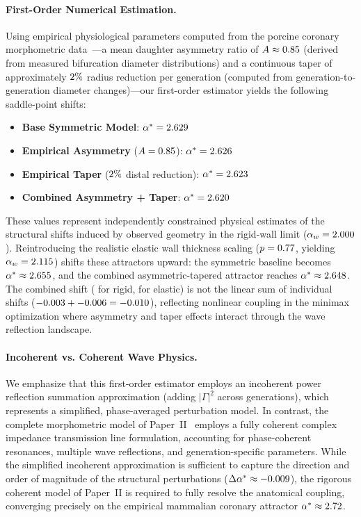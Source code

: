 \documentclass[11pt,a4paper]{article}
\theoremstyle{remark}
\begin{document}
\paragraph{First-Order Numerical Estimation.}
Using empirical physiological parameters computed from the porcine coronary
morphometric data~\cite{kassab1993,kaimovitz2008}---a mean daughter asymmetry
ratio of $A \approx 0.85$ (derived from measured bifurcation
diameter distributions) and a continuous taper of approximately
$2\%$ radius reduction per generation (computed from
generation-to-generation diameter changes)---our first-order estimator yields
the following saddle-point shifts:
\begin{itemize}
    \item
\textbf{Base Symmetric Model}: $\alpha^* = 2.629$
    \item
\textbf{Empirical Asymmetry} ($A=0.85$): $\alpha^* =
2.626$
    \item
\textbf{Empirical Taper} ($2\%$ distal reduction):
$\alpha^* = 2.623$
    \item
\textbf{Combined Asymmetry + Taper}: $\alpha^* = 2.620$
\end{itemize}
These values represent independently constrained physical estimates of the
structural shifts induced by observed geometry in the rigid-wall limit
($\alpha_w = 2.000$). Reintroducing the realistic elastic wall thickness
scaling ($p = 0.77$, yielding $\alpha_w = 2.115$) shifts these
attractors upward: the symmetric baseline becomes $\alpha^* \approx
2.655$, and the combined asymmetric-tapered attractor
reaches $\alpha^* \approx 2.648$. The combined
shift (\VarAlphaHeteroCombinedShift{} for rigid,
\VarAlphaHeteroCombinedElasticShift{} for elastic) is not the linear sum of
individual shifts ($-0.003{} + -0.006{} =
-0.010$), reflecting nonlinear coupling in the minimax optimization where
asymmetry and taper effects interact through the wave reflection landscape.

\paragraph{Incoherent vs. Coherent Wave Physics.}
We emphasize that this first-order estimator employs an incoherent power
reflection summation approximation (adding $|\Gamma|^2$ across generations),
which represents a simplified, phase-averaged perturbation model. In contrast,
the complete morphometric model of Paper~II~\cite{paperII} employs a fully
coherent complex impedance transmission line formulation, accounting for
phase-coherent resonances, multiple wave reflections, and generation-specific
parameters. While the simplified incoherent approximation is sufficient to
capture the direction and order of magnitude of the structural perturbations
($\Delta\alpha^* \approx -0.009$), the rigorous coherent
model of Paper~II is required to fully resolve the anatomical coupling,
converging precisely on the empirical mammalian coronary attractor $\alpha^*
\approx 2.72$.
\end{document}
